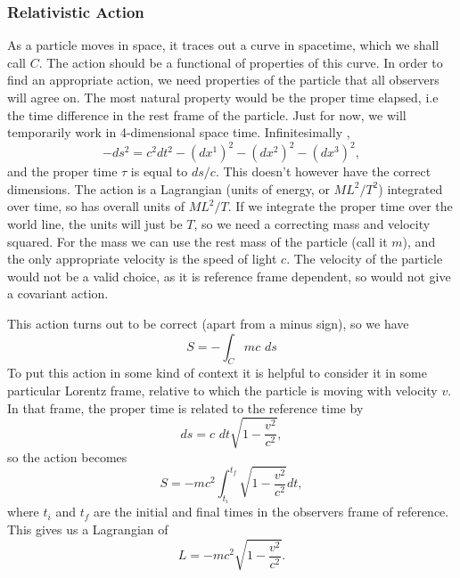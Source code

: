 \documentclass[a4paper,12pt]{article}
\numberwithin{equation}{section}
\begin{document}
\subsubsection{Relativistic Action}
As a particle moves in space, it traces out a curve in spacetime, which we shall call $C$. The action should be a functional of properties of this curve. In order to find an appropriate action, we need properties of the particle that all observers will agree on. The most natural property would be the proper time elapsed, i.e the time difference in the rest frame of the particle. Just for now, we will temporarily work in 4-dimensional space time. Infinitesimally , 
\begin{equation}
-ds^2 = c^2 dt^2 - (dx^1)^2 - (dx^2)^2 - (dx^3)^2, 
\end{equation}
and the proper time $\tau$ is equal to $ds/c$. 
This doesn't however have the correct dimensions. The action is a Lagrangian (units of energy, or $M L^2/T^2$) integrated over time, so has overall units of $M L^2/T$. If we integrate the proper time over the world line, the units will just be $T$, so we need a correcting mass and velocity squared. For the mass we can use the rest mass of the particle (call it $m$), and the only appropriate velocity is the speed of light $c$. The velocity of the particle would not be a valid choice, as it is reference frame dependent, so would not give a covariant action. 

This action turns out to be correct (apart from a minus sign), so we have
\begin{equation}\label{pointaction}
S = -\int_C mc\,\, ds 
\end{equation}
To put this action in some kind of context it is helpful to consider it in some particular Lorentz frame, relative to which the particle is moving with velocity $v$. In that frame, the proper time is related to the reference time by 
\begin{equation}
ds = c \, \, dt\sqrt{1-\frac{v^2}{c^2}},
\end{equation}
so the action becomes
\begin{equation}
S = -mc^2 \int_{t_i}^{t_f} \sqrt{1-\frac{v^2}{c^2}} dt,
\end{equation}
where $t_i$ and $t_f$ are the initial and final times in the observers frame of reference. This gives us a Lagrangian of
\begin{equation}\label{pointlagrangian}
L = -mc^2\sqrt{1-\frac{v^2}{c^2}}.
\end{equation}
\end{document}
